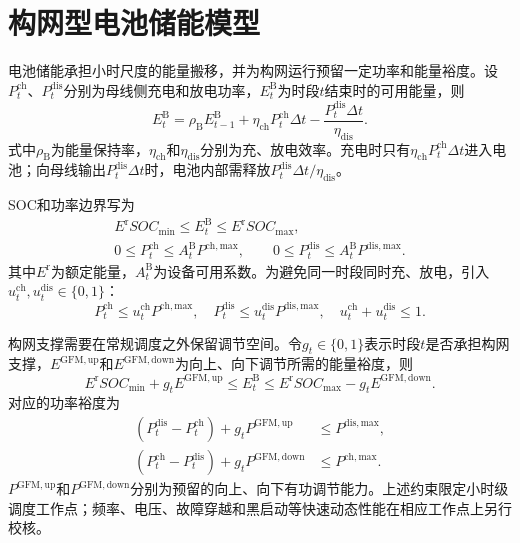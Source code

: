 \section{构网型电池储能模型}
\label{sec:battery}

电池储能承担小时尺度的能量搬移，并为构网运行预留一定功率和能量裕度。设$P_t^{\mathrm{ch}}$、$P_t^{\mathrm{dis}}$分别为母线侧充电和放电功率，$E_t^{\mathrm B}$为时段$t$结束时的可用能量，则
\begin{equation}
E_t^{\mathrm B}
=\rho_{\mathrm B}E_{t-1}^{\mathrm B}
+\eta_{\mathrm{ch}}P_t^{\mathrm{ch}}\Delta t
-\frac{P_t^{\mathrm{dis}}\Delta t}{\eta_{\mathrm{dis}}}.
\label{eq:bess-state}
\end{equation}
式中$\rho_{\mathrm B}$为能量保持率，$\eta_{\mathrm{ch}}$和$\eta_{\mathrm{dis}}$分别为充、放电效率。充电时只有$\eta_{\mathrm{ch}}P_t^{\mathrm{ch}}\Delta t$进入电池；向母线输出$P_t^{\mathrm{dis}}\Delta t$时，电池内部需释放$P_t^{\mathrm{dis}}\Delta t/\eta_{\mathrm{dis}}$。

SOC和功率边界写为
\begin{equation}
\begin{gathered}
E^{\mathrm r}SOC_{\min}\le E_t^{\mathrm B}\le E^{\mathrm r}SOC_{\max},\\
0\le P_t^{\mathrm{ch}}\le A_t^{\mathrm B}P^{\mathrm{ch,max}},\qquad
0\le P_t^{\mathrm{dis}}\le A_t^{\mathrm B}P^{\mathrm{dis,max}}.
\end{gathered}
\label{eq:bess-soc}
\end{equation}
其中$E^{\mathrm r}$为额定能量，$A_t^{\mathrm B}$为设备可用系数。为避免同一时段同时充、放电，引入$u_t^{\mathrm{ch}},u_t^{\mathrm{dis}}\in\{0,1\}$：
\begin{equation}
P_t^{\mathrm{ch}}\le u_t^{\mathrm{ch}}P^{\mathrm{ch,max}},\quad
P_t^{\mathrm{dis}}\le u_t^{\mathrm{dis}}P^{\mathrm{dis,max}},\quad
u_t^{\mathrm{ch}}+u_t^{\mathrm{dis}}\le1.
\label{eq:bess-exclusive}
\end{equation}

构网支撑需要在常规调度之外保留调节空间。令$g_t\in\{0,1\}$表示时段$t$是否承担构网支撑，$E^{\mathrm{GFM,up}}$和$E^{\mathrm{GFM,down}}$为向上、向下调节所需的能量裕度，则
\begin{equation}
E^{\mathrm r}SOC_{\min}+g_tE^{\mathrm{GFM,up}}
\le E_t^{\mathrm B}
\le E^{\mathrm r}SOC_{\max}-g_tE^{\mathrm{GFM,down}}.
\label{eq:gfm-energy-reserve}
\end{equation}
对应的功率裕度为
\begin{equation}
\begin{aligned}
(P_t^{\mathrm{dis}}-P_t^{\mathrm{ch}})+g_tP^{\mathrm{GFM,up}}
&\le P^{\mathrm{dis,max}},\\
(P_t^{\mathrm{ch}}-P_t^{\mathrm{dis}})+g_tP^{\mathrm{GFM,down}}
&\le P^{\mathrm{ch,max}}.
\end{aligned}
\label{eq:gfm-up-reserve}
\end{equation}
$P^{\mathrm{GFM,up}}$和$P^{\mathrm{GFM,down}}$分别为预留的向上、向下有功调节能力。上述约束限定小时级调度工作点；频率、电压、故障穿越和黑启动等快速动态性能在相应工作点上另行校核。
